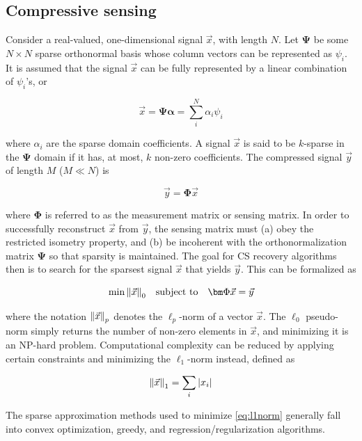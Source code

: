 \documentclass[10pt,a4paper,twoside]{article}
\begin{document}
\subsection{Compressive sensing}\label{ssec:CS}
Consider a real-valued, one-dimensional signal $\vec{x}$, with length $N$. Let $\bm\Psi$ be some $N \times N$ sparse orthonormal basis whose column vectors can be represented as $\psi_i$. It is assumed that the signal $\vec{x}$ can be fully represented by a linear combination of $\psi_i$'s, or

\begin{equation}\label{eq:sparserep}
	\vec{x} = \bm\Psi\bm\alpha = \sum_i^N \alpha_i \psi_i
\end{equation}

where $\alpha_i$ are the sparse domain coefficients. A signal $\vec{x}$ is said to be $k$-sparse in the $\bm\Psi$ domain if it has, at most, $k$ non-zero coefficients. The compressed signal $\vec{y}$ of length $M$ ($M \ll N$) is

\begin{equation}\label{eq:compressedsig}
	\vec{y} = \bm\Phi\vec{x}
\end{equation}

where $\bm\Phi$ is referred to as the measurement matrix or sensing matrix. In order to successfully reconstruct $\vec{x}$ from $\vec{y}$, the sensing matrix must (a) obey the restricted isometry property, and (b) be incoherent with the orthonormalization matrix $\bm\Psi$ so that sparsity is maintained. The goal for CS recovery algorithms then is to search for the sparsest signal $\vec{x}$ that yields $\vec{y}$. This can be formalized as

\begin{equation}\label{eq:minimize}
	\min \norm{\vec{x}}_0 \quad \textrm{subject to} \quad \bm\Phi\vec{x} = \vec{y}
\end{equation}

where the notation $\norm{\vec{x}}_p$ denotes the $\ell_p$-norm of a vector $\vec{x}$. The $\ell_0$ pseudo-norm simply returns the number of non-zero elements in $\vec{x}$, and minimizing it is an NP-hard problem. Computational complexity can be reduced by applying certain constraints and minimizing the $\ell_1$-norm instead, defined as

\begin{equation}\label{eq:l1norm}
	\norm{\vec{x}}_1 = \sum_i \abs{x_i}
\end{equation}

The sparse approximation methods used to minimize \eqref{eq:l1norm} generally fall into convex optimization, greedy, and regression/regularization algorithms.
\end{document}
